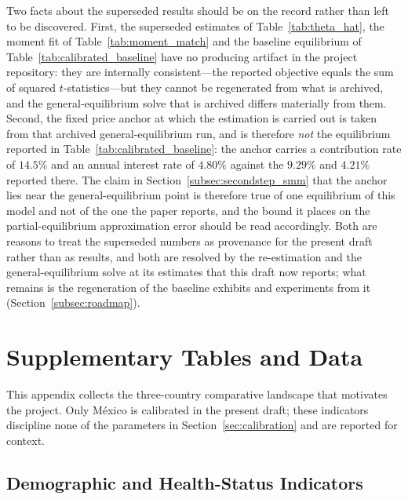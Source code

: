 \documentclass[12pt,a4paper]{article}
\begin{document}
\begin{appendices}
\label{subsec:repro}
Two facts about the superseded results should be on the record rather than left to be discovered. First, the superseded estimates of Table~\ref{tab:theta_hat}, the moment fit of Table~\ref{tab:moment_match} and the baseline equilibrium of Table~\ref{tab:calibrated_baseline} have no producing artifact in the project repository: they are internally consistent---the reported objective equals the sum of squared $t$-statistics---but they cannot be regenerated from what is archived, and the general-equilibrium solve that is archived differs materially from them. Second, the fixed price anchor at which the estimation is carried out is taken from that archived general-equilibrium run, and is therefore \emph{not} the equilibrium reported in Table~\ref{tab:calibrated_baseline}: the anchor carries a contribution rate of $14.5\%$ and an annual interest rate of $4.80\%$ against the $9.29\%$ and $4.21\%$ reported there. The claim in Section~\ref{subsec:secondstep_smm} that the anchor lies near the general-equilibrium point is therefore true of one equilibrium of this model and not of the one the paper reports, and the bound it places on the partial-equilibrium approximation error should be read accordingly. Both are reasons to treat the superseded numbers as provenance for the present draft rather than as results, and both are resolved by the re-estimation and the general-equilibrium solve at its estimates that this draft now reports; what remains is the regeneration of the baseline exhibits and experiments from it (Section~\ref{subsec:roadmap}).

\section{Supplementary Tables and Data}
\label{app:supplementary}

This appendix collects the three-country comparative landscape that motivates the project. Only M\'exico is calibrated in the present draft; these indicators discipline none of the parameters in Section~\ref{sec:calibration} and are reported for context.

\subsection{Demographic and Health-Status Indicators}
\label{app:demog_table}


\end{appendices}
\end{document}
